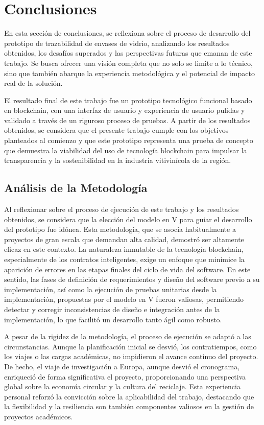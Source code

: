 \chapter[Conclusiones]{Conclusiones}
\label{cp:conclusions}

\parindent0pt

En esta sección de conclusiones, se reflexiona sobre el proceso de desarrollo del prototipo de trazabilidad de envases de vidrio, analizando los resultados obtenidos, los desafíos superados y las perspectivas futuras que emanan de este trabajo. Se busca ofrecer una visión completa que no solo se limite a lo técnico, sino que también abarque la experiencia metodológica y el potencial de impacto real de la solución. 

El resultado final de este trabajo fue un prototipo tecnológico funcional basado en blockchain, con una interfaz de usuario y experiencia de usuario pulidas y validado a través de un riguroso proceso de pruebas. A partir de los resultados obtenidos, se considera que el presente trabajo cumple con los objetivos planteados al comienzo y que este prototipo representa una prueba de concepto que demuestra la viabilidad del uso de tecnología blockchain para impulsar la transparencia y la sostenibilidad en la industria vitivinícola de la región.

\section{Análisis de la Metodología}

Al reflexionar sobre el proceso de ejecución de este trabajo y los resultados obtenidos, se considera que la elección del modelo en V para guiar el desarrollo del prototipo fue idónea. Esta metodología, que se asocia habitualmente a proyectos de gran escala que demandan alta calidad, demostró ser altamente eficaz en este contexto. La naturaleza inmutable de la tecnología blockchain, especialmente de los contratos inteligentes, exige un enfoque que minimice la aparición de errores en las etapas finales del ciclo de vida del software. En este sentido, las fases de definición de requerimientos y diseño del software previo a su implementación, así como la ejecución de pruebas unitarias desde la implementación, propuestas por el modelo en V fueron valiosas, permitiendo detectar y corregir inconsistencias de diseño e integración antes de la implementación, lo que facilitó un desarrollo tanto ágil como robusto.

A pesar de la rigidez de la metodología, el proceso de ejecución se adaptó a las circunstancias. Aunque la planificación inicial se desvió, los contratiempos, como los viajes o las cargas académicas, no impidieron el avance continuo del proyecto. De hecho, el viaje de investigación a Europa, aunque desvió el cronograma, enriqueció de forma significativa el proyecto, proporcionando una perspectiva global sobre la economía circular y la cultura del reciclaje. Esta experiencia personal reforzó la convicción sobre la aplicabilidad del trabajo, destacando que la flexibilidad y la resiliencia son también componentes valiosos en la gestión de proyectos académicos.

